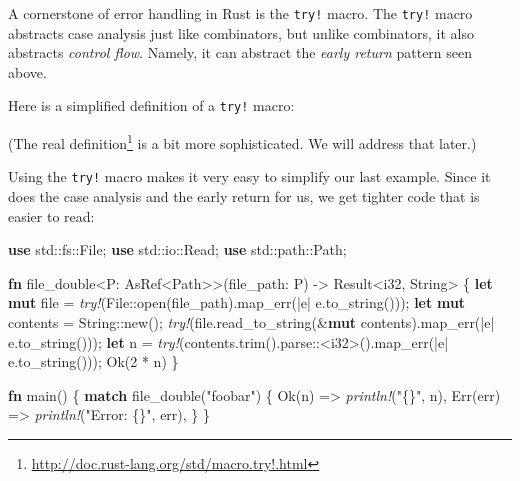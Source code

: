 \documentclass[a4paper,]{book}
\newenvironment{Shaded}{\begin{snugshade}}{\end{snugshade}}
\newcommand{\KeywordTok}[1]{\textcolor[rgb]{0.13,0.29,0.53}{\textbf{{#1}}}}
\newcommand{\DataTypeTok}[1]{\textcolor[rgb]{0.13,0.29,0.53}{{#1}}}
\newcommand{\DecValTok}[1]{\textcolor[rgb]{0.00,0.00,0.81}{{#1}}}
\newcommand{\ConstantTok}[1]{\textcolor[rgb]{0.00,0.00,0.00}{{#1}}}
\newcommand{\StringTok}[1]{\textcolor[rgb]{0.31,0.60,0.02}{{#1}}}
\newcommand{\PreprocessorTok}[1]{\textcolor[rgb]{0.56,0.35,0.01}{\textit{{#1}}}}
\newcommand{\NormalTok}[1]{{#1}}
\renewcommand{\href}[2]{#2\footnote{\url{#1}}}
\begin{document}

A cornerstone of error handling in Rust is the \texttt{try!} macro. The
\texttt{try!} macro abstracts case analysis just like combinators, but
unlike combinators, it also abstracts \emph{control flow}. Namely, it
can abstract the \emph{early return} pattern seen above.

Here is a simplified definition of a \texttt{try!} macro:

\begin{Shaded}
\end{Shaded}

(The \href{http://doc.rust-lang.org/std/macro.try!.html}{real
definition} is a bit more sophisticated. We will address that later.)

Using the \texttt{try!} macro makes it very easy to simplify our last
example. Since it does the case analysis and the early return for us, we
get tighter code that is easier to read:

\begin{Shaded}
\begin{Highlighting}[]
\KeywordTok{use} \NormalTok{std::fs::File;}
\KeywordTok{use} \NormalTok{std::io::Read;}
\KeywordTok{use} \NormalTok{std::path::Path;}

\KeywordTok{fn} \NormalTok{file_double<P: AsRef<Path>>(file_path: P) -> }\DataTypeTok{Result}\NormalTok{<}\DataTypeTok{i32}\NormalTok{, }\DataTypeTok{String}\NormalTok{> \{}
    \KeywordTok{let} \KeywordTok{mut} \NormalTok{file = }\PreprocessorTok{try!}\NormalTok{(File::open(file_path).map_err(|e| e.to_string()));}
    \KeywordTok{let} \KeywordTok{mut} \NormalTok{contents = }\DataTypeTok{String}\NormalTok{::new();}
    \PreprocessorTok{try!}\NormalTok{(file.read_to_string(&}\KeywordTok{mut} \NormalTok{contents).map_err(|e| e.to_string()));}
    \KeywordTok{let} \NormalTok{n = }\PreprocessorTok{try!}\NormalTok{(contents.trim().parse::<}\DataTypeTok{i32}\NormalTok{>().map_err(|e| e.to_string()));}
    \ConstantTok{Ok}\NormalTok{(}\DecValTok{2} \NormalTok{* n)}
\NormalTok{\}}

\KeywordTok{fn} \NormalTok{main() \{}
    \KeywordTok{match} \NormalTok{file_double(}\StringTok{"foobar"}\NormalTok{) \{}
        \ConstantTok{Ok}\NormalTok{(n) => }\PreprocessorTok{println!}\NormalTok{(}\StringTok{"\{\}"}\NormalTok{, n),}
        \ConstantTok{Err}\NormalTok{(err) => }\PreprocessorTok{println!}\NormalTok{(}\StringTok{"Error: \{\}"}\NormalTok{, err),}
    \NormalTok{\}}
\NormalTok{\}}
\end{Highlighting}
\end{Shaded}
\end{document}
